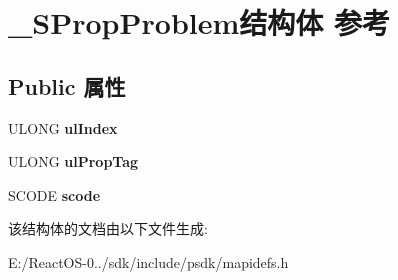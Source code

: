 \hypertarget{struct___s_prop_problem}{}\section{\+\_\+\+S\+Prop\+Problem结构体 参考}
\label{struct___s_prop_problem}
\subsection*{Public 属性}
\begin{DoxyCompactItemize}
\item 
\mbox{\label{struct___s_prop_problem_ac04438a63678151e60ea6b924bdebe47}} 
U\+L\+O\+NG {\bfseries ul\+Index}
\item 
\mbox{\label{struct___s_prop_problem_a82fa60afbf98cd5d2bc630adc8aefe43}} 
U\+L\+O\+NG {\bfseries ul\+Prop\+Tag}
\item 
\mbox{\label{struct___s_prop_problem_a8b5dba8a4ce350c913d0188bd7813fa6}} 
S\+C\+O\+DE {\bfseries scode}
\end{DoxyCompactItemize}


该结构体的文档由以下文件生成\+:\begin{DoxyCompactItemize}
\item 
E\+:/\+React\+O\+S-\/0../sdk/include/psdk/mapidefs.\+h\end{DoxyCompactItemize}
